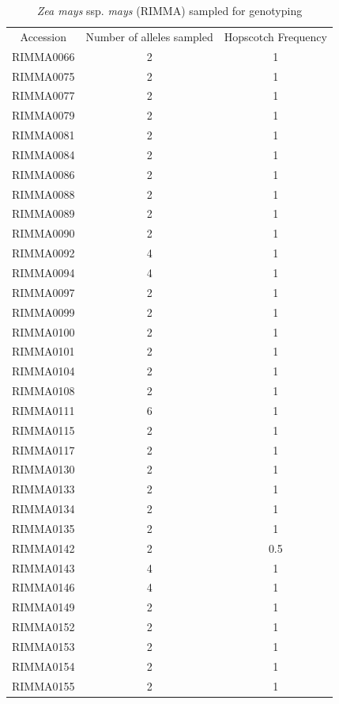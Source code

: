 \documentclass[12pt]{article}
\begin{document}
\begin{table}[htbp]
  \centering
  \caption{\emph{Zea mays} ssp. \emph{mays} (RIMMA) sampled for genotyping}
    \begin{tabular}{ccc}
    Accession & Number of alleles sampled & Hopscotch Frequency \\
    RIMMA0066 & 2     & 1 \\
    RIMMA0075 & 2     & 1 \\
    RIMMA0077 & 2     & 1 \\
    RIMMA0079 & 2     & 1 \\
    RIMMA0081 & 2     & 1 \\
    RIMMA0084 & 2     & 1 \\
    RIMMA0086 & 2     & 1 \\
    RIMMA0088 & 2     & 1 \\
    RIMMA0089 & 2     & 1 \\
    RIMMA0090 & 2     & 1 \\
    RIMMA0092 & 4     & 1 \\
    RIMMA0094 & 4     & 1 \\
    RIMMA0097 & 2     & 1 \\
    RIMMA0099 & 2     & 1 \\
    RIMMA0100 & 2     & 1 \\
    RIMMA0101 & 2     & 1 \\
    RIMMA0104 & 2     & 1 \\
    RIMMA0108 & 2     & 1 \\
    RIMMA0111 & 6     & 1 \\
    RIMMA0115 & 2     & 1 \\
    RIMMA0117 & 2     & 1 \\
    RIMMA0130 & 2     & 1 \\
    RIMMA0133 & 2     & 1 \\
    RIMMA0134 & 2     & 1 \\
    RIMMA0135 & 2     & 1 \\
    RIMMA0142 & 2     & 0.5 \\
    RIMMA0143 & 4     & 1 \\
    RIMMA0146 & 4     & 1 \\
    RIMMA0149 & 2     & 1 \\
    RIMMA0152 & 2     & 1 \\
    RIMMA0153 & 2     & 1 \\
    RIMMA0154 & 2     & 1 \\
    RIMMA0155 & 2     & 1 \\

\end{tabular}
\end{table}
\end{document}
